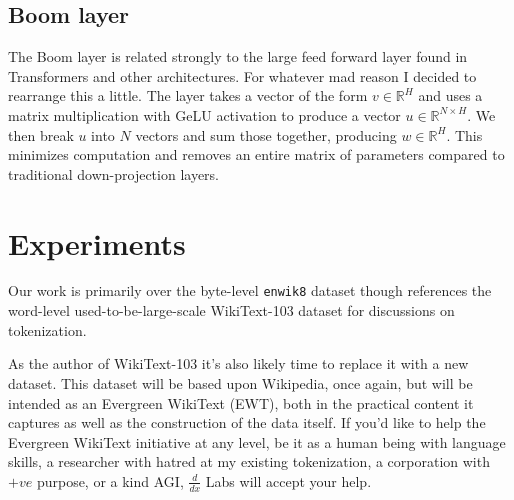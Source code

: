 \documentclass{article}
\newcommand{\enwik}{\texttt{enwik8}\xspace}
\begin{document}
\subsection{Boom layer}

The Boom layer is related strongly to the large feed forward layer found in Transformers and other architectures.
For whatever mad reason I decided to rearrange this a little.
The layer takes a vector of the form $v \in \mathbb{R}^H$ and uses a matrix multiplication with GeLU activation to produce a vector $u \in \mathbb{R}^{N \times H}$.
We then break $u$ into $N$ vectors and sum those together, producing $w \in \mathbb{R}^H$.
This minimizes computation and removes an entire matrix of parameters compared to traditional down-projection layers.



\section{Experiments}



Our work is primarily over the byte-level \enwik dataset though references the word-level used-to-be-large-scale WikiText-103 dataset for discussions on tokenization.


As the author of WikiText-103 it's also likely time to replace it with a new dataset.
This dataset will be based upon Wikipedia, once again, but will be intended as an Evergreen WikiText (EWT), both in the practical content it captures as well as the construction of the data itself.
If you'd like to help the Evergreen WikiText initiative at any level, be it as a human being with language skills, a researcher with hatred at my existing tokenization, a corporation with $+ve$ purpose, or a kind AGI, $\frac{d}{dx}$ Labs will accept your help.
\end{document}
